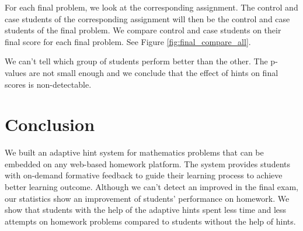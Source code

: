\documentclass{sigchi/sigchi}
\begin{document}
For each final problem, we look at the corresponding assignment. The control and case students of the corresponding assignment will then be the control and case students of the final problem. We compare control and case students on their final score for each final problem. See Figure \ref{fig:final_compare_all}.

We can't tell which group of students perform better than the other. The p-values are not small enough and we conclude that the effect of hints on final scores is non-detectable.


\section{Conclusion}
We built an adaptive hint system for mathematics problems that can be embedded on any web-based homework platform. The system provides students with on-demand formative feedback to guide their learning process to achieve better learning outcome. Although we can't detect an improved in the final exam, our statistics show an improvement of students' performance on homework. We show that students with the help of the adaptive hints spent less time and less attempts on homework problems compared to students without the help of hints.

\newpage


\end{document}

